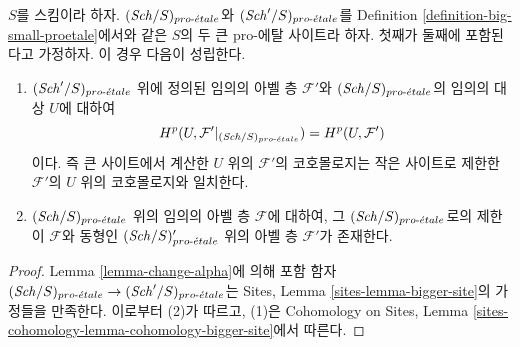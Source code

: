 \begin{lemma}
\label{lemma-cohomology-enlarge-partial-universe}
$S$를 스킴이라 하자. $(\mathit{Sch}/S)_{pro\text{-}\acute{e}tale}$와
$(\mathit{Sch}'/S)_{pro\text{-}\acute{e}tale}$를 Definition
\ref{definition-big-small-proetale}에서와 같은 $S$의 두 큰 pro-에탈
사이트라 하자. 첫째가 둘째에 포함된다고 가정하자. 이 경우 다음이
성립한다.
\begin{enumerate}
\item $(\mathit{Sch}'/S)_{pro\text{-}\acute{e}tale}$ 위에 정의된 임의의 아벨 층
$\mathcal{F}'$와 $(\mathit{Sch}/S)_{pro\text{-}\acute{e}tale}$의 임의의 대상 $U$에 대하여
$$
H^p(U, \mathcal{F}'|_{(\mathit{Sch}/S)_{pro\text{-}\acute{e}tale}}) =
H^p(U, \mathcal{F}')
$$
이다. 즉 큰 사이트에서 계산한 $U$ 위의 $\mathcal{F}'$의
코호몰로지는 작은 사이트로 제한한 $\mathcal{F}'$의 $U$ 위의
코호몰로지와 일치한다.
\item $(\mathit{Sch}/S)_{pro\text{-}\acute{e}tale}$ 위의 임의의 아벨 층 $\mathcal{F}$에
대하여, 그 $(\mathit{Sch}/S)_{pro\text{-}\acute{e}tale}$로의 제한이 $\mathcal{F}$와 동형인
$(\mathit{Sch}/S)_{pro\text{-}\acute{e}tale}'$ 위의 아벨 층 $\mathcal{F}'$가 존재한다.
\end{enumerate}
\end{lemma}

\begin{proof}
Lemma \ref{lemma-change-alpha}에 의해 포함 함자
$(\mathit{Sch}/S)_{pro\text{-}\acute{e}tale} \to (\mathit{Sch}'/S)_{pro\text{-}\acute{e}tale}$는 Sites, Lemma
\ref{sites-lemma-bigger-site}의 가정들을 만족한다. 이로부터 (2)가
따르고, (1)은 Cohomology on Sites, Lemma
\ref{sites-cohomology-lemma-cohomology-bigger-site}에서 따른다.
\end{proof}

















